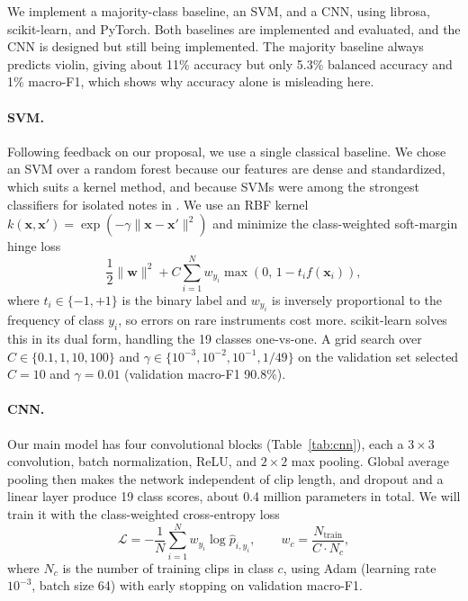 \documentclass[11pt]{article}
\begin{document}
We implement a majority-class baseline, an SVM, and a CNN, using librosa, scikit-learn, and PyTorch. Both baselines are implemented and evaluated, and the CNN is designed but still being implemented. The majority baseline always predicts violin, giving about 11\% accuracy but only 5.3\% balanced accuracy and 1\% macro-F1, which shows why accuracy alone is misleading here.

\paragraph{SVM.} Following feedback on our proposal, we use a single classical baseline. We chose an SVM over a random forest because our features are dense and standardized, which suits a kernel method, and because SVMs were among the strongest classifiers for isolated notes in \citet{herrera2003automatic}. We use an RBF kernel $k(\mathbf{x}, \mathbf{x}') = \exp(-\gamma \lVert \mathbf{x} - \mathbf{x}' \rVert^2)$ and minimize the class-weighted soft-margin hinge loss
\begin{equation}
  \frac{1}{2}\lVert \mathbf{w} \rVert^2 + C \sum_{i=1}^{N} w_{y_i} \max\left(0,\, 1 - t_i f(\mathbf{x}_i)\right),
\end{equation}
where $t_i \in \{-1, +1\}$ is the binary label and $w_{y_i}$ is inversely proportional to the frequency of class $y_i$, so errors on rare instruments cost more. scikit-learn solves this in its dual form, handling the 19 classes one-vs-one. A grid search over $C \in \{0.1, 1, 10, 100\}$ and $\gamma \in \{10^{-3}, 10^{-2}, 10^{-1}, 1/49\}$ on the validation set selected $C = 10$ and $\gamma = 0.01$ (validation macro-F1 90.8\%).

\paragraph{CNN.} Our main model has four convolutional blocks (Table~\ref{tab:cnn}), each a $3 \times 3$ convolution, batch normalization, ReLU, and $2 \times 2$ max pooling. Global average pooling then makes the network independent of clip length, and dropout and a linear layer produce 19 class scores, about 0.4 million parameters in total. We will train it with the class-weighted cross-entropy loss
\begin{equation}
  \mathcal{L} = -\frac{1}{N} \sum_{i=1}^{N} w_{y_i} \log \hat{p}_{i, y_i},
  \qquad
  w_c = \frac{N_{\text{train}}}{C \cdot N_c},
\end{equation}
where $N_c$ is the number of training clips in class $c$, using Adam (learning rate $10^{-3}$, batch size 64) with early stopping on validation macro-F1.
\end{document}
